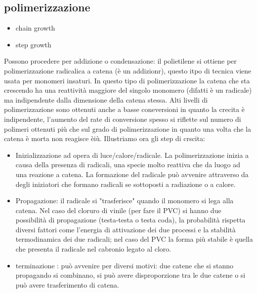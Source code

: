 \subsection{polimerizzazione}
\begin{itemize}
    \item chain growth
    \item step growth
\end{itemize}
Possono procedere per addizione o condensazione: il polietilene si ottiene per polimerizzazione radicalica a catena (è un addizionr), questo itpo di tecnica viene usata per monomeri insaturi. In questo tipo di polimerizzazione la catena che sta crescendo ha una reattività maggiore del singolo monomero (difatti è un radicale) ma indipendente dalla dimensione della catena stessa. Alti livelli di polimerizzazione sono ottenuti anche a basse coneversioni in quanto la crecita è indipendente, l'aumento del rate di conversione spesso si riflette sul numero di polimeri ottenuti più che sul grado di polimerizzazione in quanto una volta che la catena è morta non reagisce èiù.
Illustriamo ora gli step di crscita:
\begin{itemize}
    \item Inizializzazione ad opera di luce/calore/radicale. La polimerizzazione inizia a causa della presenza di radicali, una specie molto reattiva che da luogo ad una reazione a catena. La formazione del radicale può avvenire attraverso da degli iniziatori che formano radicali se sottoposti a radiazione o a calore.
    \item Propagazione: il radicale si "trasferisce" quando il monomero si lega alla catena. Nel caso del cloruro di vinile (per fare il PVC) si hanno due possibilità di propagazione (testa-testa o testa coda), la probabilità rispetta diversi fattori come l'energia di attivazione dei due processi e la stabilità termodinamica dei due radicali; nel caso del PVC la forma più stabile è quella che presenta il radicale nel cabronio legato al cloro. 
    \item terminazione : può avvenire per diversi motivi: due catene che si stanno propagando si combinano, si può avere disproporzione tra le due catene o si può avere trasferimento di catena.
    \end{itemize}
